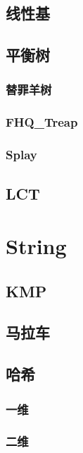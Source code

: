 \documentclass[twocolumn,a4paper]{article}  %
\begin{document}
\subsection{线性基}

\subsection{平衡树}
\subsubsection{替罪羊树}

\subsubsection{FHQ\_Treap}


\subsubsection{Splay}

\subsection{LCT}

\newpage
\section{String}
\subsection{KMP}

\subsection{马拉车}

\subsection{哈希}
\subsubsection{一维}

\subsubsection{二维}

\end{document}
